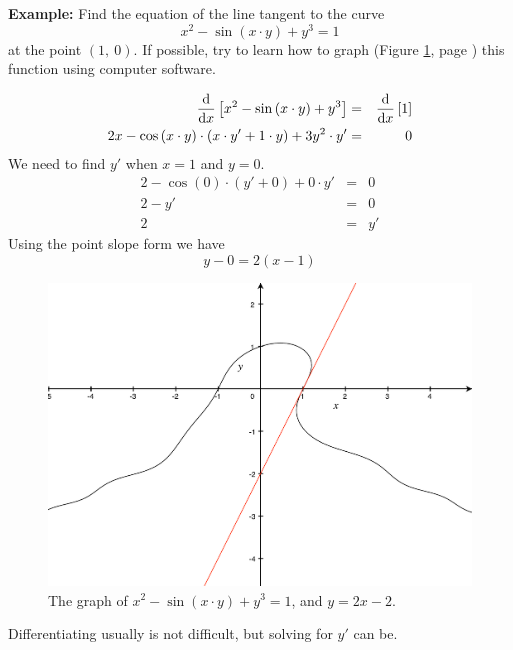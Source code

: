\documentclass[12pt,addpoints, answers, fleqn]{exam}
\begin{document}
\textbf{Example:} Find the equation of the line tangent to the curve
\[
x^2 - \sin \left( x \cdot y \right) + y^3 = 1 
\]
at the point $\left( 1, \ 0 \right)$. If possible, try to learn how to graph (Figure \ref{fig:graph1802}, page \pageref{fig:graph1802}) this function using computer software.

\begin{solution}
\begin{eqnarray*}
\frac{{\rm{d}}}{{\rm{d}}x} \left[x^2 - \sin \left( x \cdot y \right) + y^3\right] &=& \frac{{\rm{d}}}{{\rm{d}}x} \left[1\right]\\
2x - \cos \left( x \cdot y \right) \cdot \left( x \cdot y' + 1 \cdot y \right) + 3y^2 \cdot y' &=& 0
\end{eqnarray*}
We need to find $y'$ when $x=1$ and $y=0$.
\begin{eqnarray*}
2 - \cos \left( 0 \right) \cdot \left( y' + 0 \right) + 0 \cdot y' &=& 0\\
2 - y'  &=& 0\\
2    &=& y'
\end{eqnarray*}
Using the point slope form we have
\[
y - 0 = 2 \left( x - 1 \right)
\]
\end{solution}

\begin{figure}[htbp] %
   \centering
   \includegraphics[width=5in]{./graphics/graph1802.pdf} 
   \caption{The graph of $x^2 - \sin \left( x \cdot y \right) + y^3 = 1$, and $y=2x-2$.}
   \label{fig:graph1802}
\end{figure}



Differentiating usually is not difficult, but solving for $y'$ can be.
\end{document}
